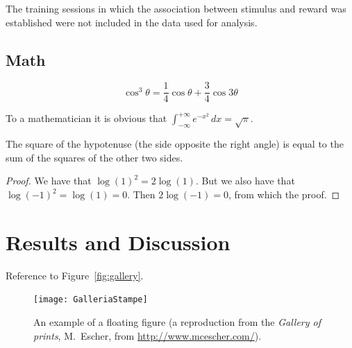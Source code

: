 \documentclass[
10pt, %
a4paper, %
oneside, %
headinclude,footinclude, %
BCOR5mm, %
]{scrartcl}
\begin{document}
The training sessions in which the association between stimulus and reward was established were not included in the data used for analysis.

\subsection{Math}

\lipsum[4] %

\begin{equation}
\cos^3 \theta =\frac{1}{4}\cos\theta+\frac{3}{4}\cos 3\theta
\label{eq:refname2}
\end{equation}

\lipsum[5] %

\begin{definition}[Gauss] 
To a mathematician it is obvious that
$\int_{-\infty}^{+\infty}
e^{-x^2}\,dx=\sqrt{\pi}$. 
\end{definition} 

\begin{theorem}[Pythagoras]
The square of the hypotenuse (the side opposite the right angle) is equal to the sum of the squares of the other two sides.
\end{theorem}

\begin{proof} 
We have that $\log(1)^2 = 2\log(1)$.
But we also have that $\log(-1)^2=\log(1)=0$.
Then $2\log(-1)=0$, from which the proof.
\end{proof}


\section{Results and Discussion}

Reference to Figure~\vref{fig:gallery}. %

\begin{figure}[tb]
\centering 
\texttt{[image: GalleriaStampe]} 
\caption[An example of a floating figure]{An example of a floating figure (a reproduction from the \emph{Gallery of prints}, M.~Escher, from \url{http://www.mcescher.com/}).} %
\label{fig:gallery} 
\end{figure}
\end{document}
